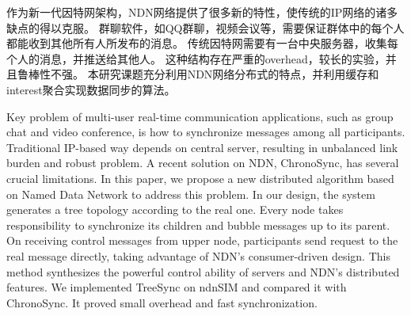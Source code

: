 ﻿
\begin{cnabstract}
作为新一代因特网架构，NDN网络提供了很多新的特性，使传统的IP网络的诸多缺点的得以克服。
群聊软件，如QQ群聊，视频会议等，需要保证群体中的每个人都能收到其他所有人所发布的消息。
传统因特网需要有一台中央服务器，收集每个人的消息，并推送给其他人。
这种结构存在严重的overhead，较长的实验，并且鲁棒性不强。
本研究课题充分利用NDN网络分布式的特点，并利用缓存和interest聚合实现数据同步的算法。

\end{cnabstract}


\begin{enabstract}

Key problem of multi-user real-time communication applications,
such as group chat and video conference,
is how to synchronize messages among all participants.
Traditional IP-based way depends on central server, resulting in unbalanced link burden and robust problem.
A recent solution on NDN, ChronoSync, has several crucial limitations.
In this paper, we propose a new distributed algorithm based on Named Data Network to address this problem.
In our design, the system generates a tree topology according to the real one.
Every node takes responsibility to synchronize its children and bubble messages up to its parent.
On receiving control messages from upper node,
participants send request to the real message directly, taking advantage of NDN's consumer-driven design.
This method synthesizes the powerful control ability of servers and NDN's distributed features.
We implemented TreeSync on ndnSIM and compared it with ChronoSync.
It proved small overhead and fast synchronization.


\end{enabstract}
